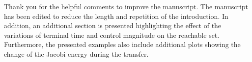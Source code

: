 \documentclass[11pt]{article}
\begin{document}
\begin{itemize}
        Thank you for the helpful comments to improve the manuscript.
        The manuscript has been edited to reduce the length and repetition of the introduction.
        In addition, an additional section is presented highlighting the effect of the variations of terminal time and control magnitude on the reachable set. 
        Furthermore, the presented examples also include additional plots showing the change of the Jacobi energy during the transfer. 
\end{itemize}
% 
% 
\end{document}
